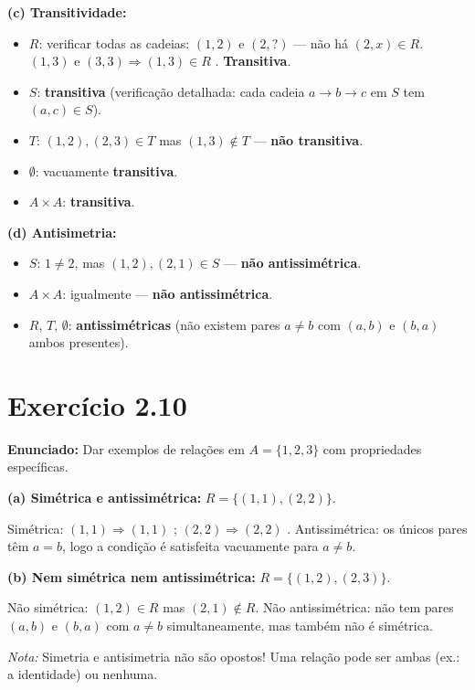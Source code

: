 \documentclass[12pt,a4paper]{article}
\begin{document}
\textbf{(c) Transitividade:}
\begin{itemize}
  \item $R$: verificar todas as cadeias: $(1,2)$ e $(2,?)$ --- não há $(2,x) \in R$. $(1,3)$ e $(3,3) \Rightarrow (1,3) \in R$ \checkmark. \textbf{Transitiva}.
  \item $S$: \textbf{transitiva} (verificação detalhada: cada cadeia $a \to b \to c$ em $S$ tem $(a,c) \in S$).
  \item $T$: $(1,2),(2,3) \in T$ mas $(1,3) \notin T$ --- \textbf{não transitiva}.
  \item $\emptyset$: vacuamente \textbf{transitiva}.
  \item $A \times A$: \textbf{transitiva}.
\end{itemize}

\textbf{(d) Antisimetria:}
\begin{itemize}
  \item $S$: $1 \neq 2$, mas $(1,2),(2,1) \in S$ --- \textbf{não antissimétrica}.
  \item $A \times A$: igualmente --- \textbf{não antissimétrica}.
  \item $R$, $T$, $\emptyset$: \textbf{antissimétricas} (não existem pares $a \neq b$ com $(a,b)$ e $(b,a)$ ambos presentes).
\end{itemize}

\section*{Exercício 2.10}

\textbf{Enunciado:} Dar exemplos de relações em $A = \{1,2,3\}$ com propriedades específicas.

\textbf{(a) Simétrica e antissimétrica:} $R = \{(1,1),(2,2)\}$.

Simétrica: $(1,1) \Rightarrow (1,1)$ \checkmark; $(2,2) \Rightarrow (2,2)$ \checkmark. Antissimétrica: os únicos pares têm $a = b$, logo a condição é satisfeita vacuamente para $a \neq b$.

\textbf{(b) Nem simétrica nem antissimétrica:} $R = \{(1,2),(2,3)\}$.

Não simétrica: $(1,2) \in R$ mas $(2,1) \notin R$. Não antissimétrica: não tem pares $(a,b)$ e $(b,a)$ com $a \neq b$ simultaneamente, mas também não é simétrica.

\begin{notabox}
\textit{Nota:} Simetria e antisimetria não são opostos! Uma relação pode ser ambas (ex.: a identidade) ou nenhuma.
\end{notabox}
\end{document}
